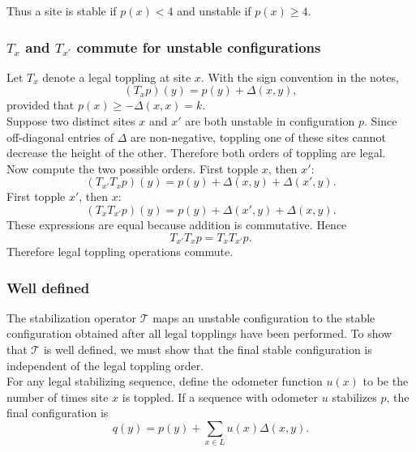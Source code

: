 \documentclass{article}
\begin{document}
Thus a site is stable if \(p(x)<4\) and unstable if \(p(x)\ge 4\).

\subsubsection{$T_x$ and $T_{x'}$ commute for unstable configurations}
Let \(T_x\) denote a legal toppling at site \(x\). With the sign convention in the notes,
\[
(T_xp)(y)=p(y)+\Delta(x,y),
\]
provided that \(p(x)\ge -\Delta(x,x)=k\).\\

Suppose two distinct sites \(x\) and \(x'\) are both unstable in configuration \(p\). Since off-diagonal entries of \(\Delta\) are non-negative, toppling one of these sites cannot decrease the height of the other. Therefore both orders of toppling are legal.\\

Now compute the two possible orders. First topple \(x\), then \(x'\):
\[
(T_{x'}T_xp)(y)
=p(y)+\Delta(x,y)+\Delta(x',y).
\]
First topple \(x'\), then \(x\):
\[
(T_xT_{x'}p)(y)
=p(y)+\Delta(x',y)+\Delta(x,y).
\]
These expressions are equal because addition is commutative. Hence
\[
T_{x'}T_xp=T_xT_{x'}p.
\]
Therefore legal toppling operations commute.

\hspace{2mm}

\subsubsection{Well defined}

The stabilization operator \(\mathcal{T}\) maps an unstable configuration to the stable configuration obtained after all legal topplings have been performed. To show that \(\mathcal{T}\) is well defined, we must show that the final stable configuration is independent of the legal toppling order.\\

For any legal stabilizing sequence, define the odometer function \(u(x)\) to be the number of times site \(x\) is toppled. If a sequence with odometer \(u\) stabilizes \(p\), the final configuration is
\[
q(y)=p(y)+\sum_{x\in L}u(x)\Delta(x,y).
\]
\end{document}
